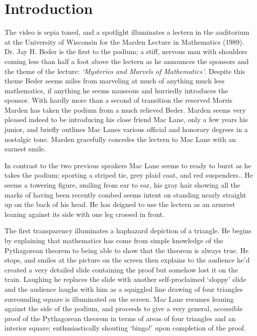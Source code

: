 \section{Introduction}

The video is sepia toned, and a spotlight illuminates a lectern in the auditorium at the University of Wisconsin for the Marden Lecture in Mathematics (1989). Dr. Jay H. Beder is the first to the podium; a stiff, nervous man with shoulders coming less than half a foot above the lectern as he announces the sponsors and the theme of the lecture: \emph{`Mysteries and Marvels of Mathematics'}. Despite this theme Beder seems miles from marveling at much of anything much less mathematics, if anything he seems nauseous and hurriedly introduces the sponsor. With hardly more than a second of transition the reserved Morris Marden has taken the podium from a much relieved Beder. Marden seems very pleased indeed to be introducing his close friend Mac Lane, only a few years his junior, and briefly outlines Mac Lanes various official and honorary degrees in a nostalgic tone. Marden gracefully concedes the lectern to Mac Lane with an earnest smile.

In contrast to the two previous speakers Mac Lane seems to ready to burst as he takes the podium; sporting a striped tie, grey plaid coat, and red suspenders.. He seems a towering figure, smiling from ear to ear, his gray hair showing all the marks of having been recently combed seems intent on standing nearly straight up on the back of his head. He has deigned to use the lectern as an armrest leaning against its side with one leg crossed in front.  

The first transparency illuminates a haphazard depiction of a triangle. He begins by explaining that mathematics has come from simple knowledge of the Pythagorean theorem to being able to show that the theorem is always true. He stops, and smiles at the picture on the screen then explains to the audience he'd created a very detailed slide containing the proof but somehow lost it on the train. Laughing he replaces the slide with another self-proclaimed `sloppy' slide and the audience laughs with him as a squiggled line drawing of four triangles surrounding square is illuminated on the screen. Mac Lane resumes leaning against the side of the podium, and proceeds to give a very general, accessible proof of the Pythagorean theorem in terms of areas of four triangles and an interior square; enthusiastically shouting `bingo!' upon completion of the proof. 

